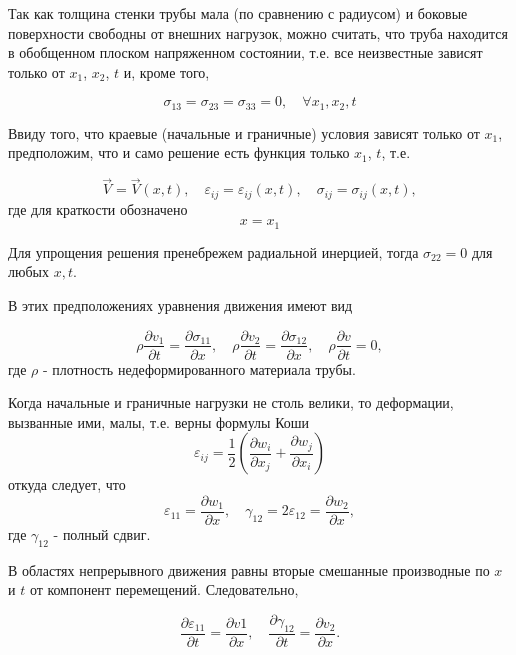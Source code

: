 \documentclass[specialist, subf, href, colorlinks=true, 14pt, final]{disser}
\theoremstyle{definition}
\begin{document}
Так как толщина стенки трубы мала (по сравнению с радиусом) и боковые поверхности свободны от внешних нагрузок, можно считать, что труба находится в обобщенном плоском напряженном состоянии, т.е. все неизвестные зависят только от $x_1$, $x_2$, $t$ и, кроме того,
\addtocounter{equation}{1}
	\begin{equation}\label{eq:232}
		 \sigma_{13} = \sigma_{23} = \sigma_{33} = 0, \quad \forall x_1, x_2, t
  	\tag{2}
	\end{equation}

Ввиду того, что краевые (начальные и граничные) условия зависят только от $x_1$, предположим, что и само решение есть функция только $x_1$, $t$, т.е.
\addtocounter{equation}{1}
	\begin{equation}\label{eq:233}
		\overrightarrow{V} = \overrightarrow{V}(x,t), \quad \varepsilon_{ij} = \varepsilon_{ij}(x,t), \quad \sigma_{ij} = \sigma_{ij}(x,t),	 
  	\tag{3}
	\end{equation}
где для краткости обозначено 
\[ x = x_1 \]

Для упрощения решения пренебрежем радиальной инерцией, тогда $\sigma_{22} = 0$ для любых $x, t$.

В этих предположениях уравнения движения имеют вид 
\addtocounter{equation}{1}
\begin{equation}\label{eq:234}
		\rho\frac{\partial v_1}{\partial t} = \frac{\partial \sigma_{11}}{\partial x} , \quad \rho\frac{\partial v_2}{\partial t} = \frac{\partial \sigma_{12}}{\partial x}, \quad	\rho\frac{\partial v}{\partial t} = 0, 
  	\tag{4}
\end{equation}
где $\rho$ - плотность недеформированного материала трубы.

Когда начальные и граничные нагрузки не столь велики, то деформации, вызванные ими, малы, т.е. верны формулы Коши
\[
	\varepsilon_{ij} = \frac{1}{2}\left( \frac{\partial w_i}{\partial x_j} + \frac{\partial w_j}{\partial x_i} \right)
\]
откуда следует, что 
\[
	\varepsilon_{11} = \frac{\partial w_1}{\partial x}, \quad \gamma_{12} = 2 \varepsilon_{12} = \frac{\partial w_2}{\partial x},
\]
где $\gamma_{12}$ - полный сдвиг.

В областях непрерывного движения равны вторые смешанные производные по $x$ и $t$ от компонент перемещений. Следовательно,
\addtocounter{equation}{1}
\begin{equation}\label{eq:235}
		\frac{\partial \varepsilon_{11}}{\partial t} = \frac{\partial v{1}}{\partial x} , \quad \frac{\partial \gamma_{12}}{\partial t} = \frac{\partial v_{2}}{\partial x}. 
  	\tag{5}
\end{equation}
\end{document}
